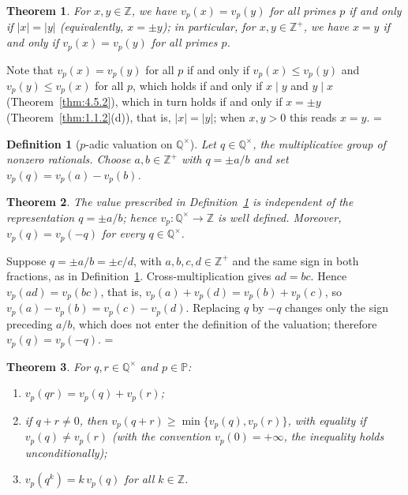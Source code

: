 \documentclass[11pt]{article}
\makeatletter
\let\nt@closedisplay\]
\def\nt@guardedclose{\@ifnextchar\par{\nt@closeafterpar}{\@ifnextchar\end{\postdisplaypenalty\@M\nt@closedisplay}{\nt@closedisplay}}}
\def\nt@closeafterpar\par{\@ifnextchar\par{\nt@closeafterpar}{\@ifnextchar\end{\postdisplaypenalty\@M\nt@closedisplay\par}{\nt@closedisplay\par}}}
\renewenvironment{proof}[1][\proofname]{\par
  \pushQED{\qed}\normalfont\topsep\medskipamount\edef\nt@afterproof{\@endparpenalty=\the\@endparpenalty\relax}\@beginparpenalty\@M\@endparpenalty\@M\let\]\nt@guardedclose\trivlist\item[]\textit{#1\@addpunct{.}} \ignorespaces}{\ifvmode\addpenalty\@M\fi\popQED\nt@afterproof\endtrivlist\@endpefalse}
\theoremstyle{ntstyle}
\newtheorem{theorem}{Theorem}[subsection]
\newtheorem{definition}{Definition}[subsection]
\newcommand{\Primes}{\mathbb{P}}
\makeatother
\begin{document}
\begin{theorem}\label{thm:4.5.3}
  For $x, y \in \mathbb{Z}$, we have $v_p(x) = v_p(y)$ for all primes $p$ if and only if $|x| = |y|$ (equivalently,
  $x = \pm y$); in particular, for $x, y \in \mathbb{Z}^+$, we have $x = y$ if and only if $v_p(x) = v_p(y)$ for
  all primes $p$.

\end{theorem}

\begin{proof}
  Note that $v_p(x) = v_p(y)$ for all $p$ if and only if $v_p(x) \le v_p(y)$ and $v_p(y) \le v_p(x)$ for all $p$,
  which holds if and only if $x \mid y$ and $y \mid x$ (Theorem~\ref{thm:4.5.2}), which in turn holds if and only
  if $x = \pm y$ (Theorem~\ref{thm:1.1.2}(d)), that is, $|x| = |y|$; when $x, y > 0$ this reads $x = y$.
\end{proof}

\begin{definition}[$p$-adic valuation on $\mathbb{Q}^{\times}$]\label{def:4.5.2}\label{def:p-adic-valuation-on-q-nonzero}
  Let $q \in \mathbb{Q}^{\times}$, the multiplicative group
  of nonzero rationals. Choose
  $a,b\in\mathbb{Z}^+$ with $q=\pm a/b$ and set
  $v_p(q)=v_p(a)-v_p(b)$.

\end{definition}

\begin{theorem}\label{thm:4.5.4} The value prescribed in Definition~\ref{def:4.5.2} is
  independent of the representation $q=\pm a/b$; hence
  $v_p:\mathbb{Q}^{\times}\to\mathbb{Z}$ is well defined. Moreover,
  $v_p(q)=v_p(-q)$ for every $q\in\mathbb{Q}^{\times}$.

\end{theorem}

\begin{proof} Suppose $q=\pm a/b=\pm c/d$, with
  $a,b,c,d \in \mathbb{Z}^+$ and the same sign in both fractions, as in
  Definition~\ref{def:4.5.2}. Cross-multiplication gives $ad = bc$. Hence $v_p(ad) = v_p(bc)$, that is,
  $v_p(a) + v_p(d) = v_p(b) + v_p(c)$, so
  $v_p(a) - v_p(b) = v_p(c) - v_p(d)$. Replacing $q$ by $-q$ changes only
  the sign preceding $a/b$, which does not enter
  the definition of the valuation; therefore $v_p(q)=v_p(-q)$.
\end{proof}

\begin{theorem}\label{thm:4.5.5} For $q, r \in \mathbb{Q}^{\times}$ and
  $p \in \Primes$:

  \begin{enumerate}[label={\alph*)}]
    \item $v_p(qr) = v_p(q) + v_p(r)$;
    \item if $q + r \neq 0$, then $v_p(q + r) \ge \min\{v_p(q), v_p(r)\}$, with equality if
          $v_p(q) \neq v_p(r)$ (with the convention $v_p(0) = +\infty$, the inequality holds unconditionally);
    \item $v_p(q^{k}) = k\, v_p(q)$ for all $k \in \mathbb{Z}$.
  \end{enumerate}

\end{theorem}
\end{document}
